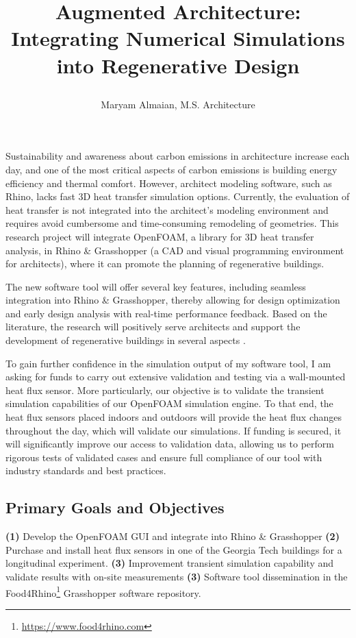 \documentclass[11pt, notitlepage]{article} %
\begin{document}
\title{
\begin{center}
\noindent\LARGE\textbf{Augmented Architecture: Integrating Numerical Simulations into Regenerative Design}
\end{center}
}
\author{Maryam Almaian, M.S. Architecture}
\date{} %

\maketitle

\vspace{-0.5in}    
Sustainability and awareness about carbon emissions in architecture increase each day, and one of the most critical aspects of carbon emissions is building energy efficiency and thermal comfort. 
However, architect modeling software, such as Rhino, lacks fast 3D heat transfer simulation options. 
Currently, the evaluation of heat transfer is not integrated into the architect's modeling environment and requires avoid cumbersome and time-consuming remodeling of geometries. 
This research project will integrate OpenFOAM, a library for 3D heat transfer analysis, in Rhino \& Grasshopper (a CAD and visual programming environment for architects), where it can promote the planning of regenerative buildings. 

The new software tool will offer several key features, including seamless integration into Rhino \& Grasshopper, thereby allowing for design optimization and early design analysis with real-time performance feedback. 
Based on the literature, the research will positively serve architects and support the development of regenerative buildings in several aspects \cite{kastner2020solving,mantesi2018modelling}. 


To gain further confidence in the simulation output of my software tool, I am asking for funds to carry out extensive validation and testing via a wall-mounted heat flux sensor. 
More particularly, our objective is to validate the transient simulation capabilities of our OpenFOAM simulation engine.
To that end, the heat flux sensors placed indoors and outdoors will provide the heat flux changes throughout the day, which will validate our simulations. 
If funding is secured, it will significantly improve our access to validation data, allowing us to perform rigorous tests of validated cases and ensure full compliance of our tool with industry standards and best practices. 


\subsection*{Primary Goals and Objectives}
\textbf{(1)} Develop the OpenFOAM GUI and integrate into Rhino \& Grasshopper
\textbf{(2)} Purchase and install heat flux sensors in one of the Georgia Tech buildings for a longitudinal experiment.
\textbf{(3)} Improvement transient simulation capability and validate results with on-site measurements
\textbf{(3)} Software tool dissemination in the Food4Rhino\footnote{\url{https://www.food4rhino.com}} Grasshopper software repository. 
\end{document}
